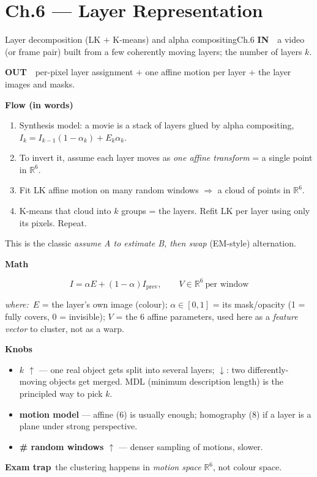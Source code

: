 \documentclass[9pt,a4paper]{extarticle}
\newcommand{\IN}{\textbf{\color{cIn}IN}\ }
\newcommand{\OUT}{\par\textbf{\color{cOut}OUT}\ }
\newcommand{\FLOW}{\par\smallskip\textbf{Flow (in words)}\par\nopagebreak}
\newcommand{\MATH}{\par\smallskip\textbf{Math}\par\nopagebreak}
\newcommand{\KNOBS}{\par\smallskip\textbf{Knobs}\par\nopagebreak}
\newcommand{\TRAP}{\par\smallskip\textbf{\color{cTrap}Exam trap}\ }
\newcommand{\WHERE}{\par\textit{where:}\ }
\newcommand{\up}{$\uparrow$}
\newcommand{\dn}{$\downarrow$}
\newcommand{\kn}[2]{\item \textbf{#1} --- #2}
\begin{document}
\section{Ch.6 --- Layer Representation}

\begin{card}{Layer decomposition (LK $+$ K-means) and alpha compositing}{Ch.6}
\IN\ a video (or frame pair) built from a few coherently moving layers; the number of layers $k$.
\OUT\ per-pixel layer assignment $+$ one affine motion per layer $+$ the layer images and masks.

\FLOW
\begin{enumerate}
  \item Synthesis model: a movie is a stack of layers glued by alpha compositing, $I_k=I_{k-1}(1-\alpha_k)+E_k\alpha_k$.
  \item To invert it, assume each layer moves as \emph{one affine transform} = a single point in $\mathbb R^6$.
  \item Fit LK affine motion on many random windows $\Rightarrow$ a cloud of points in $\mathbb R^6$.
  \item K-means that cloud into $k$ groups = the layers. Refit LK per layer using only its pixels. Repeat.
\end{enumerate}
This is the classic \emph{assume A to estimate B, then swap} (EM-style) alternation.

\MATH
\[ I=\alpha E+(1-\alpha)I_{\text{prev}},\qquad V\in\mathbb R^6\ \text{per window} \]
\WHERE $E$ = the layer's own image (colour); $\alpha\in[0,1]$ = its mask/opacity (1 = fully covers, 0 = invisible); $V$ = the 6 affine parameters, used here as a \emph{feature vector} to cluster, not as a warp.

\KNOBS
\begin{itemize}
  \kn{$k$ \up}{one real object gets split into several layers; \dn: two differently-moving objects get merged. MDL (minimum description length) is the principled way to pick $k$.}
  \kn{motion model}{affine (6) is usually enough; homography (8) if a layer is a plane under strong perspective.}
  \kn{\# random windows \up}{denser sampling of motions, slower.}
\end{itemize}
\TRAP the clustering happens in \emph{motion space} $\mathbb R^6$, not colour space.
\end{card}
\end{document}
